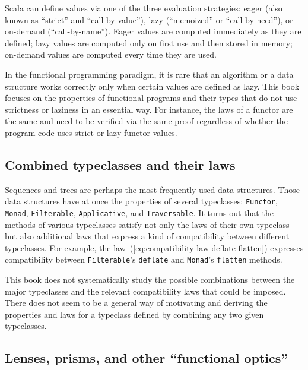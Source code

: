 Scala can define values via one of the three evaluation strategies:
eager (also known as \textsf{``}strict\textsf{''} and \textsf{``}call-by-value\textsf{''}), lazy (\textsf{``}memoized\textsf{''}
or \textsf{``}call-by-need\textsf{''}), or on-demand (\textsf{``}call-by-name\textsf{''}). Eager values
are computed immediately as they are defined; lazy values are computed
only on first use and then stored in memory; on-demand values are
computed every time they are used. 

In the functional programming paradigm, it is rare that an algorithm
or a data structure works correctly only when certain values are defined
as lazy. This book focuses on the properties of functional programs
and their types that do not use strictness or laziness in an essential
way. For instance, the laws of a functor are the same and need to
be verified via the same proof regardless of whether the program code
uses strict or lazy functor values. 

\subsection{Combined typeclasses and their laws}

Sequences and trees are perhaps the most frequently used data structures.
Those data structures have at once the properties of several typeclasses:
\lstinline!Functor!, \lstinline!Monad!, \lstinline!Filterable!,
\lstinline!Applicative!, and \lstinline!Traversable!. It turns out
that the methods of various typeclasses satisfy not only the laws
of their own typeclass but also additional laws that express a kind
of compatibility between different typeclasses. For example, the law~(\ref{eq:compatibility-law-deflate-flatten})
expresses compatibility between \lstinline!Filterable!\textsf{'}s \lstinline!deflate!
and \lstinline!Monad!\textsf{'}s \lstinline!flatten! methods.

This book does not systematically study the possible combinations
between the major typeclasses and the relevant compatibility laws
that could be imposed. There does not seem to be a general way of
motivating and deriving the properties and laws for a typeclass defined
by combining any two given typeclasses.

\subsection{Lenses, prisms, and other \textquotedblleft functional optics\textquotedblright}

